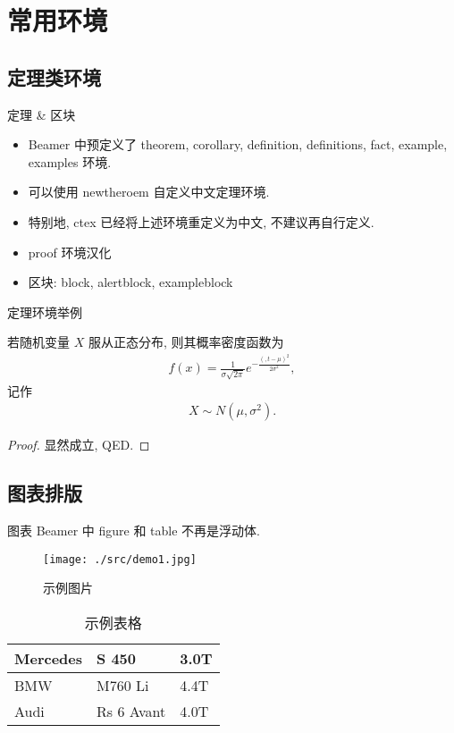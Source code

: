 \documentclass[aspectratio=169]{beamer}  %
\begin{document}
\section{常用环境}
\subsection{定理类环境}
\begin{frame}{定理 \& 区块}
    \begin{itemize}
        \item Beamer 中预定义了 theorem, corollary, definition, definitions, fact, example, examples 环境.
        \item 可以使用 newtheroem 自定义中文定理环境.
        \item 特别地, ctex 已经将上述环境重定义为中文, 不建议再自行定义.
        \item proof 环境汉化
        \item 区块: block, alertblock, exampleblock
    \end{itemize}
\end{frame}

\begin{frame}{定理环境举例}
	\begin{definition}
		若随机变量 $X$ 服从正态分布, 则其概率密度函数为
		\begin{align}
			f(x)=\frac{1}{\sigma \sqrt{2 \pi}} e^{-\frac{(, t-\mu)^{2}}{2 \sigma^{2}}},
		\end{align}
		记作
		\begin{align}
			X \sim N(\mu, \sigma^2).
		\end{align}
	\end{definition}
	\begin{proof}
		显然成立, QED.
	\end{proof}
\end{frame}

\subsection{图表排版}
\begin{frame}{图表}
	Beamer 中 figure 和 table 不再是浮动体.
	\begin{figure}
		\centering
		\texttt{[image: ./src/demo1.jpg]}
		\caption{示例图片}
	\end{figure}
	\begin{table}[!ht]
		\centering
		\begin{tabular}{|l|l|l|}
			\hline
			Mercedes & S 450 & 3.0T \\ \hline
			BMW & M760 Li & 4.4T \\ \hline
			Audi & Rs 6 Avant & 4.0T \\ \hline
		\end{tabular}
		\caption{示例表格}
	\end{table}
\end{frame}
\end{document}
